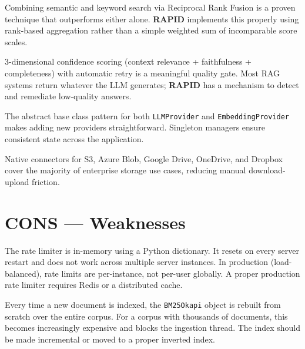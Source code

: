 \documentclass[12pt, a4paper, oneside]{report}
\newcommand{\kw}[1]{\texttt{\small #1}}
\newcommand{\rapidsys}{\textbf{\color{rapidblue}RAPID}}
\begin{document}
\begin{probox}
Combining semantic and keyword search via Reciprocal Rank Fusion is a proven technique
that outperforms either alone. \rapidsys{} implements this properly using rank-based
aggregation rather than a simple weighted sum of incomparable score scales.
\end{probox}

\begin{probox}
3-dimensional confidence scoring (context relevance + faithfulness + completeness) with
automatic retry is a meaningful quality gate. Most RAG systems return whatever the LLM
generates; \rapidsys{} has a mechanism to detect and remediate low-quality answers.
\end{probox}

\begin{probox}
The abstract base class pattern for both \kw{LLMProvider} and \kw{EmbeddingProvider}
makes adding new providers straightforward. Singleton managers ensure consistent state
across the application.
\end{probox}

\begin{probox}
Native connectors for S3, Azure Blob, Google Drive, OneDrive, and Dropbox cover the
majority of enterprise storage use cases, reducing manual download-upload friction.
\end{probox}

\section{CONS — Weaknesses}

\begin{conbox}
The rate limiter is in-memory using a Python dictionary. It resets on every server restart
and does not work across multiple server instances. In production (load-balanced), rate
limits are per-instance, not per-user globally. A proper production rate limiter requires
Redis or a distributed cache.
\end{conbox}

\begin{conbox}
Every time a new document is indexed, the \kw{BM25Okapi} object is rebuilt from scratch
over the entire corpus. For a corpus with thousands of documents, this becomes increasingly
expensive and blocks the ingestion thread. The index should be made incremental or moved
to a proper inverted index.
\end{conbox}
\end{document}
